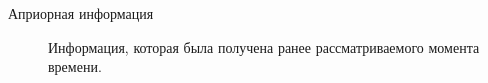 \Defines %
\begin{description}
	
	\item[Априорная информация]  Информация, которая была получена ранее рассматриваемого момента времени\cite{def01}.
	
	
\end{description}

